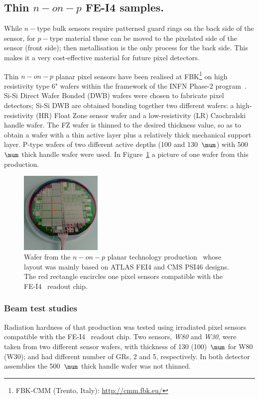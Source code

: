 \subsection{Thin $n-on-p$ FE-I4 samples.}
\label{sec:PAE2pixels}

While $n-$type bulk sensors require patterned guard rings on the back side of the sensor, for $p-$type material these can be moved to the pixelated side of the sensor (front side); then metallisation is the only process for the back side. This makes it a very cost-effective material for future pixel detectors. 

Thin $n-on-p$ planar pixel sensors have been realised at FBK\footnote{FBK-CMM (Trento, Italy): \url{http://cmm.fbk.eu/}} on high resistivity type 6" 
wafers within 
the  framework of the INFN Phase-2 program~\cite{DALLABETTA2016388}.
Si-Si Direct Wafer Bonded (DWB) wafers were chosen to fabricate pixel detectors;  Si-Si DWB  are obtained bonding together two different wafers: a high-resistivity (HR) Float Zone sensor wafer and a low-resistivity (LR) Czochralski handle wafer. The FZ wafer is thinned to the desired thickness value, so as to obtain a wafer with a thin active layer plus a relatively thick mechanical support layer. P-type wafers of two different active depths (100 and 130~$\mum$) with 500~$\mum$  thick handle wafer were used. 
In Figure~\ref{fig:wafer.png} a picture of one wafer from this production.
\begin{figure}[!htpb]
\centering
\includegraphics[width=0.35\textwidth]{wafer.png}
\caption{\label{fig:wafer.png} Wafer from the $n-on-p$ planar technology production~\cite{DALLABETTA2016388}  whose layout was mainly based on ATLAS FEI4 and CMS PSI46 designs. The red rectangle 
encircles one pixel sensors compatible with the FE-I4~\cite{FEI4} 
readout chip.}
\end{figure}

\subsubsection{Beam test studies}
Radiation hardness of that production was tested  using irradiated pixel sensors compatible with the FE-I4~\cite{FEI4} readout chip. Two sensors, {\it W80} and {\it W30}, were taken from two different sensor wafers, 
with thickness of 130 (100)~$\mum$ for W80 (W30);
and had different number of GRs,  2 and 5, respectively.  In both detector assemblies the 500~$\mum$  thick handle wafer was not thinned.

